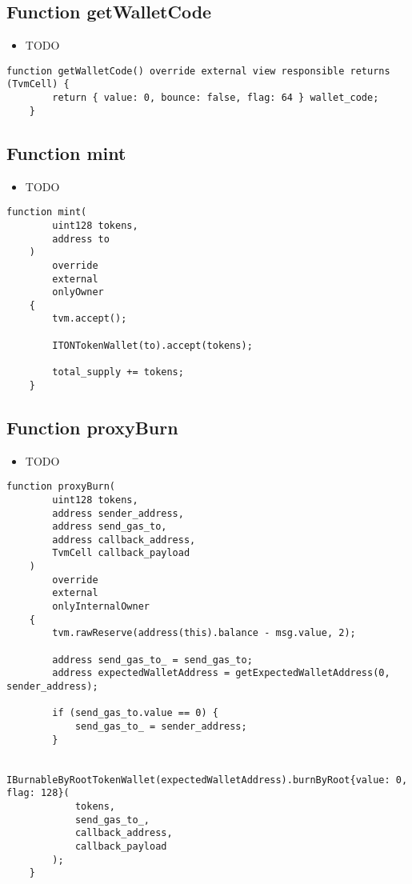 \subsection{Function getWalletCode}

\noindent\begin{itemize}
\item TODO
\end{itemize}

\begin{lstlisting}[firstnumber=101]
    function getWalletCode() override external view responsible returns (TvmCell) {
        return { value: 0, bounce: false, flag: 64 } wallet_code;
    }
\end{lstlisting}

\subsection{Function mint}

\noindent\begin{itemize}
\item TODO
\end{itemize}

\begin{lstlisting}[firstnumber=283]
    function mint(
        uint128 tokens,
        address to
    )
        override
        external
        onlyOwner
    {
        tvm.accept();

        ITONTokenWallet(to).accept(tokens);

        total_supply += tokens;
    }
\end{lstlisting}

\subsection{Function proxyBurn}

\noindent\begin{itemize}
\item TODO
\end{itemize}

\begin{lstlisting}[firstnumber=308]
    function proxyBurn(
        uint128 tokens,
        address sender_address,
        address send_gas_to,
        address callback_address,
        TvmCell callback_payload
    )
        override
        external
        onlyInternalOwner
    {
        tvm.rawReserve(address(this).balance - msg.value, 2);

        address send_gas_to_ = send_gas_to;
        address expectedWalletAddress = getExpectedWalletAddress(0, sender_address);

        if (send_gas_to.value == 0) {
            send_gas_to_ = sender_address;
        }

        IBurnableByRootTokenWallet(expectedWalletAddress).burnByRoot{value: 0, flag: 128}(
            tokens,
            send_gas_to_,
            callback_address,
            callback_payload
        );
    }
\end{lstlisting}

